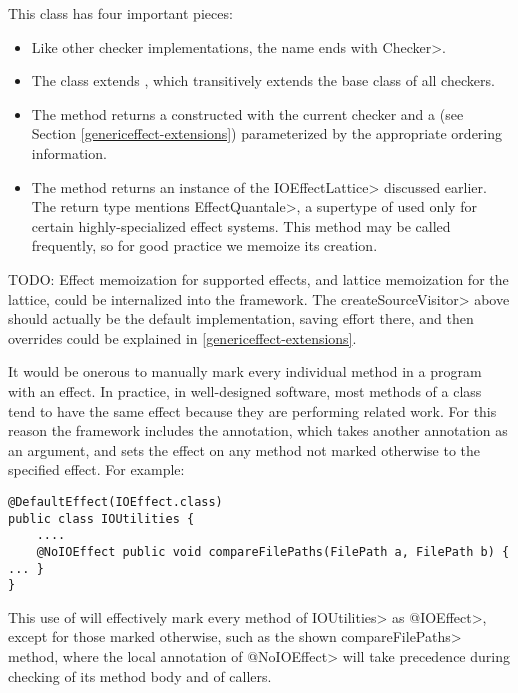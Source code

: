 This class has four important pieces:
\begin{itemize}
    \item Like other checker implementations, the name ends with \<Checker>.
    \item The class extends , which transitively extends the base class of all checkers.
    \item The  method returns a  constructed with the current checker and a  (see Section \ref{genericeffect-extensions}) parameterized by the appropriate ordering information.
    \item The  method returns an instance of the \<IOEffectLattice> discussed earlier.  The return type mentions \<EffectQuantale>, a supertype of  used only for certain highly-specialized effect systems.  This method may be called frequently, so for good practice we memoize its creation.
\end{itemize}

TODO: Effect memoization for supported effects, and lattice memoization for the lattice, could be internalized into the framework. The \<createSourceVisitor> above should actually be the default implementation, saving effort there, and then overrides could be explained in \ref{genericeffect-extensions}.




It would be onerous to manually mark every individual method in a program with an effect.  In practice, in well-designed software, most methods of a class tend to have the same effect because they are performing related work. For this reason the framework includes the  annotation, which takes another annotation as an argument, and sets the effect on any method not marked otherwise to the specified effect.  For example:

\begin{Verbatim}
@DefaultEffect(IOEffect.class)
public class IOUtilities {
    ....
    @NoIOEffect public void compareFilePaths(FilePath a, FilePath b) { ... }
}
\end{Verbatim}
This use of  will effectively mark every method of \<IOUtilities> as \<@IOEffect>, except for those marked otherwise, such as the shown \<compareFilePaths> method, where the local annotation of \<@NoIOEffect> will take precedence during checking of its method body and of callers.

